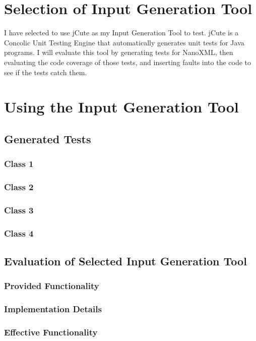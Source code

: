 \documentclass[letterpaper,10pt]{article}
\begin{document}
\section{Selection of Input Generation Tool}
I have selected to use jCute as my Input Generation Tool to test. jCute is a Concolic Unit Testing
 Engine that automatically generates unit tests for Java programs. I will evaluate this tool by 
generating tests for NanoXML, then evaluating the code coverage of those tests, and inserting 
faults into the code to see if the tests catch them.

\section{Using the Input Generation Tool}
	\subsection{Generated Tests}
		\subsubsection{Class 1}
		

		\subsubsection{Class 2}
		

		\subsubsection{Class 3}
		

		\subsubsection{Class 4}
		
	\subsection{Evaluation of Selected Input Generation Tool}
		\subsubsection{Provided Functionality}
		\subsubsection{Implementation Details}
		\subsubsection{Effective Functionality}
\end{document}
